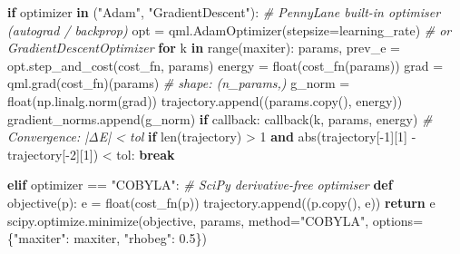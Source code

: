 \documentclass[
  11pt,
]{report}
\newenvironment{Shaded}{}{}
\newcommand{\BuiltInTok}[1]{\textcolor[rgb]{0.00,0.50,0.00}{#1}}
\newcommand{\CommentTok}[1]{\textcolor[rgb]{0.38,0.63,0.69}{\textit{#1}}}
\newcommand{\ControlFlowTok}[1]{\textcolor[rgb]{0.00,0.44,0.13}{\textbf{#1}}}
\newcommand{\DecValTok}[1]{\textcolor[rgb]{0.25,0.63,0.44}{#1}}
\newcommand{\FloatTok}[1]{\textcolor[rgb]{0.25,0.63,0.44}{#1}}
\newcommand{\KeywordTok}[1]{\textcolor[rgb]{0.00,0.44,0.13}{\textbf{#1}}}
\newcommand{\NormalTok}[1]{#1}
\newcommand{\OperatorTok}[1]{\textcolor[rgb]{0.40,0.40,0.40}{#1}}
\newcommand{\StringTok}[1]{\textcolor[rgb]{0.25,0.44,0.63}{#1}}
\begin{document}
\begin{Shaded}
\begin{Highlighting}[]
    \ControlFlowTok{if}\NormalTok{ optimizer }\KeywordTok{in}\NormalTok{ (}\StringTok{"Adam"}\NormalTok{, }\StringTok{"GradientDescent"}\NormalTok{):}
        \CommentTok{\# PennyLane built{-}in optimiser (autograd / backprop)}
\NormalTok{        opt }\OperatorTok{=}\NormalTok{ qml.AdamOptimizer(stepsize}\OperatorTok{=}\NormalTok{learning\_rate)  }\CommentTok{\# or GradientDescentOptimizer}
        \ControlFlowTok{for}\NormalTok{ k }\KeywordTok{in} \BuiltInTok{range}\NormalTok{(maxiter):}
\NormalTok{            params, prev\_e }\OperatorTok{=}\NormalTok{ opt.step\_and\_cost(cost\_fn, params)}
\NormalTok{            energy }\OperatorTok{=} \BuiltInTok{float}\NormalTok{(cost\_fn(params))}
\NormalTok{            grad }\OperatorTok{=}\NormalTok{ qml.grad(cost\_fn)(params)          }\CommentTok{\# shape: (n\_params,)}
\NormalTok{            g\_norm }\OperatorTok{=} \BuiltInTok{float}\NormalTok{(np.linalg.norm(grad))}
\NormalTok{            trajectory.append((params.copy(), energy))}
\NormalTok{            gradient\_norms.append(g\_norm)}
            \ControlFlowTok{if}\NormalTok{ callback:}
\NormalTok{                callback(k, params, energy)}
            \CommentTok{\# Convergence: |ΔE| \textless{} tol}
            \ControlFlowTok{if} \BuiltInTok{len}\NormalTok{(trajectory) }\OperatorTok{\textgreater{}} \DecValTok{1} \KeywordTok{and} \BuiltInTok{abs}\NormalTok{(trajectory[}\OperatorTok{{-}}\DecValTok{1}\NormalTok{][}\DecValTok{1}\NormalTok{] }\OperatorTok{{-}}\NormalTok{ trajectory[}\OperatorTok{{-}}\DecValTok{2}\NormalTok{][}\DecValTok{1}\NormalTok{]) }\OperatorTok{\textless{}}\NormalTok{ tol:}
                \ControlFlowTok{break}

    \ControlFlowTok{elif}\NormalTok{ optimizer }\OperatorTok{==} \StringTok{"COBYLA"}\NormalTok{:}
        \CommentTok{\# SciPy derivative{-}free optimiser}
        \KeywordTok{def}\NormalTok{ objective(p):}
\NormalTok{            e }\OperatorTok{=} \BuiltInTok{float}\NormalTok{(cost\_fn(p))}
\NormalTok{            trajectory.append((p.copy(), e))}
            \ControlFlowTok{return}\NormalTok{ e}
\NormalTok{        scipy.optimize.minimize(objective, params, method}\OperatorTok{=}\StringTok{"COBYLA"}\NormalTok{,}
\NormalTok{                                options}\OperatorTok{=}\NormalTok{\{}\StringTok{"maxiter"}\NormalTok{: maxiter, }\StringTok{"rhobeg"}\NormalTok{: }\FloatTok{0.5}\NormalTok{\})}


\end{Highlighting}
\end{Shaded}
\end{document}
